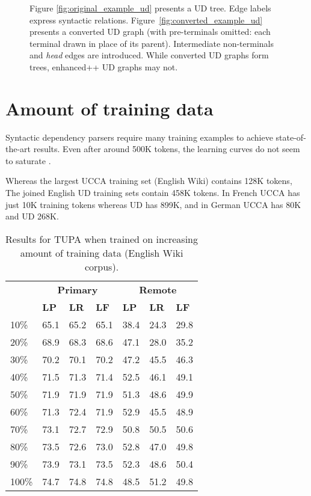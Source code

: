 \documentclass[11pt,a4paper]{article}
\begin{document}
\begin{figure}[!ht]
\caption{Figure \ref{fig:original_example_ud} presents a UD tree.
  Edge labels express syntactic relations.
Figure~\ref{fig:converted_example_ud} presents a converted UD graph
(with pre-terminals omitted: each terminal drawn in place of its parent).
Intermediate non-terminals and \textit{head} edges are introduced.
While converted UD graphs form trees, enhanced++ UD graphs may not.}\label{fig:ud_examples}
\end{figure}


\section{Amount of training data}\label{sec:data_size}

Syntactic dependency parsers require many training examples to achieve
state-of-the-art results.
Even after around 500K tokens, the learning curves do not seem to saturate
\cite{de2017old,velldal2017joint}.

Whereas the largest UCCA training set (English Wiki) contains 128K tokens,
The joined English UD training sets contain 458K tokens.
In French UCCA has just 10K training tokens whereas UD has 899K,
and in German UCCA has 80K and UD 268K.

\begin{table}[t]
\centering
\begin{tabular}{l|lll|lll}
& \multicolumn{3}{c|}{\footnotesize \bf Primary} & \multicolumn{3}{c}{\footnotesize \bf Remote} \\
& \footnotesize \textbf{LP} & \footnotesize \textbf{LR} & \footnotesize \textbf{LF}
& \footnotesize \textbf{LP} & \footnotesize \textbf{LR} & \footnotesize \textbf{LF} \\
\hline
\footnotesize 10\% & 65.1 & 65.2 & 65.1 & 38.4 & 24.3 & 29.8\\
\footnotesize 20\% & 68.9 & 68.3 & 68.6 & 47.1 & 28.0 & 35.2\\
\footnotesize 30\% & 70.2 & 70.1 & 70.2 & 47.2 & 45.5 & 46.3\\
\footnotesize 40\% & 71.5 & 71.3 & 71.4 & 52.5 & 46.1 & 49.1\\
\footnotesize 50\% & 71.9 & 71.9 & 71.9 & 51.3 & 48.6 & 49.9\\
\footnotesize 60\% & 71.3 & 72.4 & 71.9 & 52.9 & 45.5 & 48.9\\
\footnotesize 70\% & 73.1 & 72.7 & 72.9 & 50.8 & 50.5 & 50.6\\
\footnotesize 80\% & 73.5 & 72.6 & 73.0 & 52.8 & 47.0 & 49.8\\
\footnotesize 90\% & 73.9 & 73.1 & 73.5 & 52.3 & 48.6 & 50.4\\
\footnotesize 100\% & 74.7 & 74.8 & 74.8 & 48.5 & 51.2 & 49.8\\
\end{tabular}
\caption{
Results for TUPA \protect\cite{hershcovich2017a} when trained on increasing amount of training data
(English Wiki corpus).
\label{tab:partial_data_results}}
\end{table}
\end{document}
